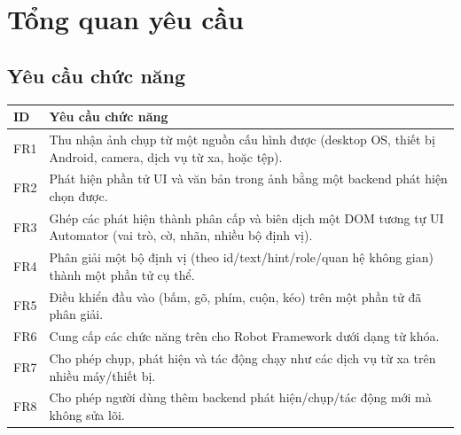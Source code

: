 \documentclass[11pt,a4paper]{report}
\begin{document}
\section{Tổng quan yêu cầu}
\subsection*{Yêu cầu chức năng}
\begin{longtable}{@{}p{1.6cm}p{12.6cm}@{}}
\toprule
\textbf{ID} & \textbf{Yêu cầu chức năng} \\
\midrule
\endhead
FR1 & Thu nhận ảnh chụp từ một nguồn cấu hình được (desktop OS, thiết bị Android, camera, dịch vụ từ xa, hoặc tệp). \\
FR2 & Phát hiện phần tử UI và văn bản trong ảnh bằng một backend phát hiện chọn được. \\
FR3 & Ghép các phát hiện thành phân cấp và biên dịch một DOM tương tự UI Automator (vai trò, cờ, nhãn, nhiều bộ định vị). \\
FR4 & Phân giải một bộ định vị (theo id/text/hint/role/quan hệ không gian) thành một phần tử cụ thể. \\
FR5 & Điều khiển đầu vào (bấm, gõ, phím, cuộn, kéo) trên một phần tử đã phân giải. \\
FR6 & Cung cấp các chức năng trên cho Robot Framework dưới dạng từ khóa. \\
FR7 & Cho phép chụp, phát hiện và tác động chạy như các dịch vụ từ xa trên nhiều máy/thiết bị. \\
FR8 & Cho phép người dùng thêm backend phát hiện/chụp/tác động mới mà không sửa lõi. \\
\bottomrule
\end{longtable}
\end{document}
